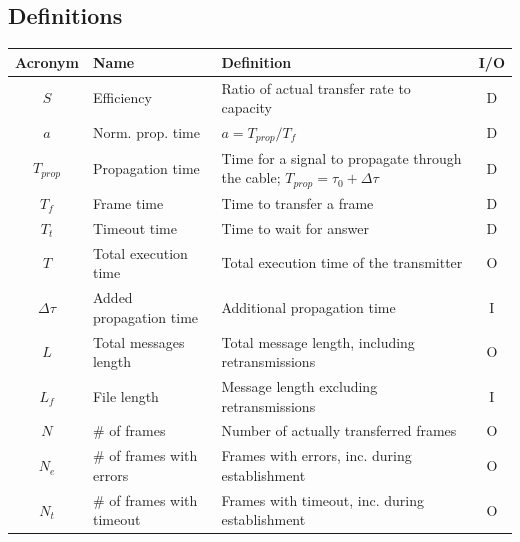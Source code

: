 \documentclass[a4paper, 11pt]{report}
\begin{document}
\subsection{Definitions}

\begin{center}
	\small
	\begin{tabular}{c | l | p{83mm} | c}
		\hline \hline
		\textbf{Acronym} & \textbf{Name}             & \textbf{Definition}                                                                & I/O \\ \hline
		$S$              & Efficiency                & Ratio of actual transfer rate to capacity                                          & D   \\
		$a$              & Norm. prop. time          & $a = T_{prop}/T_f$                                                                 & D   \\
		$T_{prop}$       & Propagation time          & Time for a signal to propagate through the cable; $T_{prop} = \tau_0 + \Delta\tau$ & D   \\
		$T_f$            & Frame time                & Time to transfer a frame                                                           & D   \\
		$T_t$            & Timeout time              & Time to wait for answer                                                            & D   \\
		$T$              & Total execution time      & Total execution time of the transmitter                                            & O   \\
		$\Delta\tau$     & Added propagation time    & Additional propagation time                                                        & I   \\
		$L$              & Total messages length     & Total message length, including retransmissions                                    & O   \\
		$L_f$            & File length               & Message length excluding retransmissions                                           & I   \\
		$N$				 & \# of frames              & Number of actually transferred frames                                              & O   \\
		$N_e$            & \# of frames with errors  & Frames with errors, inc. during establishment                                      & O   \\
		$N_t$            & \# of frames with timeout & Frames with timeout, inc. during establishment                                     & O   \\

\end{tabular}
\end{center}
\end{document}
